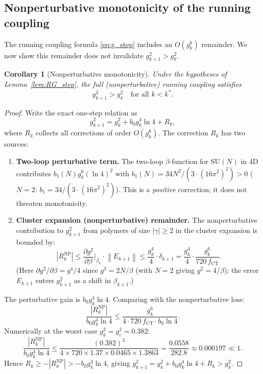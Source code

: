 \documentclass[11pt,a4paper]{amsart}
\newtheorem{corollary}[theorem]{Corollary}
\theoremstyle{definition}
\newcommand{\SU}{\mathrm{SU}}
\newcommand{\norm}[1]{\left\|#1\right\|}
\newcommand{\gB}{g^2_c}
\newcommand{\CT}{\mathrm{CT}}
\begin{document}
\subsection{Nonperturbative monotonicity of the running coupling}
\label{sec:np_monotone}

The running coupling formula \eqref{eq:g_step} includes an $O(g^6_k)$ remainder.
We now show this remainder does not invalidate $g^2_{k+1} > g^2_k$.

\begin{corollary}[Nonperturbative monotonicity]
\label{cor:monotone}
Under the hypotheses of Lemma~\ref{lem:RG_step}, the full (nonperturbative)
running coupling satisfies
\[
  g^2_{k+1} > g^2_k
  \quad\text{for all } k < k^*.
\]
\end{corollary}
\begin{proof}
Write the exact one-step relation as
\[
  g^2_{k+1} = g^2_k + b_0 g^4_k \ln 4 + R_k,
\]
where $R_k$ collects all corrections of order $O(g^6_k)$.
The correction $R_k$ has two sources:
\begin{enumerate}[label=(\roman*)]
\item \textbf{Two-loop perturbative term.}
  The two-loop $\beta$-function for $\SU(N)$ in 4D contributes
  $b_1(N) g^6_k (\ln 4)^2$ with $b_1(N) = 34N^2/(3\cdot(16\pi^2)^2) > 0$
  ($N=2$: $b_1 = 34/(3\cdot(16\pi^2)^2)$).
  This is a \emph{positive} correction; it does not threaten monotonicity.
\item \textbf{Cluster expansion (nonperturbative) remainder.}
  The nonperturbative contribution to $g^2_{k+1}$ from polymers of size
  $|\gamma| \ge 2$ in the cluster expansion is bounded by:
  \[
    |R_k^{\mathrm{NP}}| \le \frac{\partial g^2}{\partial \beta}\bigg|_{\beta_k}
    \cdot \norm{E_{k+1}}
    \le \frac{g^4_k}{4}\cdot\delta_{k+1}
    = \frac{g^4_k}{4}\cdot\frac{g^6_k}{720\,f_{\CT}}.
  \]
  (Here $\partial g^2/\partial\beta = g^4/4$ since $g^2 = 2N/\beta$ (with $N=2$ giving $g^2=4/\beta$);
   the error $E_{k+1}$ enters $g^2_{k+1}$ as a shift in $\beta_{k+1}$.)
\end{enumerate}
The perturbative gain is $b_0 g^4_k \ln 4$.
Comparing with the nonperturbative loss:
\[
  \frac{|R_k^{\mathrm{NP}}|}{b_0 g^4_k \ln 4}
  \le \frac{g^6_k}{4\cdot 720\,f_{\CT}\cdot b_0\ln 4}.
\]
Numerically at the worst case $g^2_k = \gB = 0.382$:
\[
  \frac{|R_k^{\mathrm{NP}}|}{b_0 g^4_k \ln 4}
  \le \frac{(0.382)^3}{4\times 720\times 1.37\times 0.0465\times 1.3863}
  = \frac{0.0558}{282.8}
  \approx 0.000197 \ll 1.
\]
Hence $R_k \ge -|R_k^{\mathrm{NP}}| > -b_0 g^4_k \ln 4$, giving
$g^2_{k+1} = g^2_k + b_0 g^4_k \ln 4 + R_k > g^2_k$.
\end{proof}
\end{document}
